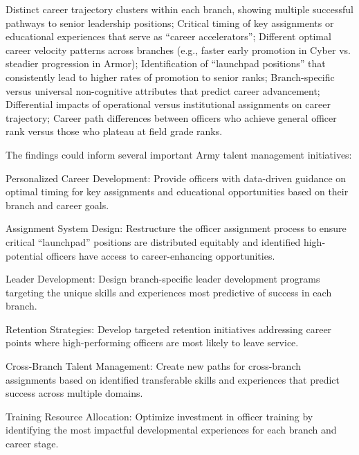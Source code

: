 \documentclass[../main.tex]{subfiles}
\begin{document}
Distinct career trajectory clusters within each branch, showing multiple successful pathways to senior leadership positions; Critical timing of key assignments or educational experiences that serve as ``career accelerators''; Different optimal career velocity patterns across branches (e.g., faster early promotion in Cyber vs. steadier progression in Armor); Identification of ``launchpad positions'' that consistently lead to higher rates of promotion to senior ranks; Branch-specific versus universal non-cognitive attributes that predict career advancement; Differential impacts of operational versus institutional assignments on career trajectory; Career path differences between officers who achieve general officer rank versus those who plateau at field grade ranks.

The findings could inform several important Army talent management initiatives:

Personalized Career Development: Provide officers with data-driven guidance on optimal timing for key assignments and educational opportunities based on their branch and career goals.

Assignment System Design: Restructure the officer assignment process to ensure critical ``launchpad'' positions are distributed equitably and identified high-potential officers have access to career-enhancing opportunities.

Leader Development: Design branch-specific leader development programs targeting the unique skills and experiences most predictive of success in each branch.

Retention Strategies: Develop targeted retention initiatives addressing career points where high-performing officers are most likely to leave service.

Cross-Branch Talent Management: Create new paths for cross-branch assignments based on identified transferable skills and experiences that predict success across multiple domains.

Training Resource Allocation: Optimize investment in officer training by identifying the most impactful developmental experiences for each branch and career stage.

\end{document}
